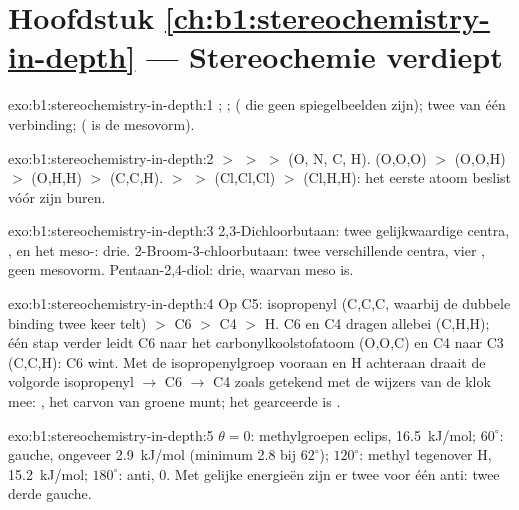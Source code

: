 \section*{Hoofdstuk \ref{ch:b1:stereochemistry-in-depth} --- Stereochemie verdiept}

\begin{solution}{exo:b1:stereochemistry-in-depth:1}
; ;  ( die
geen spiegelbeelden zijn); twee  van één verbinding;
 ( is de mesovorm).
\end{solution}

\begin{solution}{exo:b1:stereochemistry-in-depth:2}
 $>$  $>$  $>$  (O, N, C, H).
 (O,O,O) $>$  (O,O,H) $>$  (O,H,H) $>$
 (C,C,H).  $>$  $>$  (Cl,Cl,Cl)
$>$  (Cl,H,H): het eerste atoom beslist vóór zijn buren.
\end{solution}

\begin{solution}{exo:b1:stereochemistry-in-depth:3}
2,3-Dichloorbutaan: twee gelijkwaardige centra, ,  en
het meso-: drie. 2-Broom-3-chloorbutaan: twee verschillende
centra, vier , geen mesovorm. Pentaan-2,4-diol: drie,
waarvan  meso is.
\end{solution}

\begin{solution}{exo:b1:stereochemistry-in-depth:4}
Op C5: isopropenyl (C,C,C, waarbij de dubbele binding twee keer telt)
$>$ C6 $>$ C4 $>$ H. C6 en C4 dragen allebei (C,H,H); één stap verder
leidt C6 naar het carbonylkoolstofatoom (O,O,C) en C4 naar C3 (C,C,H): C6
wint. Met de isopropenylgroep vooraan en H achteraan draait de volgorde
isopropenyl $\to$ C6 $\to$ C4 zoals getekend met de wijzers van de klok
mee: , het carvon van groene munt; het gearceerde is .
\end{solution}

\begin{solution}{exo:b1:stereochemistry-in-depth:5}
$\theta = 0$: methylgroepen eclips, \qty{16.5}{kJ/mol}; $60^\circ$: gauche,
ongeveer \qty{2.9}{kJ/mol} (minimum 2.8 bij $62^\circ$); $120^\circ$:
methyl tegenover H, \qty{15.2}{kJ/mol}; $180^\circ$: anti, 0. Met gelijke
energieën zijn er twee  voor één anti: twee derde
gauche.
\end{solution}

